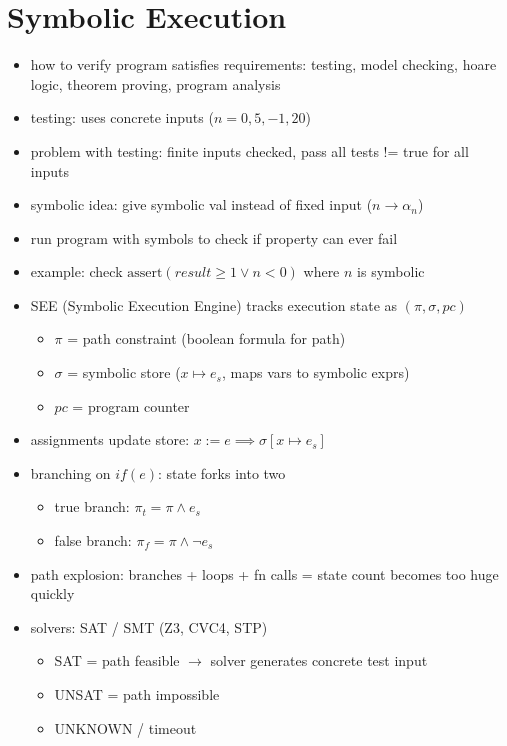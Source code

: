
\setcounter{chapter}{2}
\chapter{Symbolic Execution}

\begin{itemize}
\item how to verify program satisfies requirements: testing, model checking, hoare logic, theorem proving, program analysis

\item testing: uses concrete inputs ($n=0, 5, -1, 20$)
\item problem with testing: finite inputs checked, pass all tests != true for all inputs

\item symbolic idea: give symbolic val instead of fixed input ($n \rightarrow \alpha_n$)
\item run program with symbols to check if property can ever fail
\item example: check $\text{assert}(result \geq 1 \lor n < 0)$ where $n$ is symbolic

\item SEE (Symbolic Execution Engine) tracks execution state as $(\pi, \sigma, pc)$
\begin{itemize}
    \item $\pi$ = path constraint (boolean formula for path)
    \item $\sigma$ = symbolic store ($x \mapsto e_s$, maps vars to symbolic exprs)
    \item $pc$ = program counter
\end{itemize}

\item assignments update store: $x := e \implies \sigma[x \mapsto e_s]$

\item branching on $if(e)$: state forks into two
\begin{itemize}
    \item true branch: $\pi_t = \pi \land e_s$
    \item false branch: $\pi_f = \pi \land \neg e_s$
\end{itemize}

\item path explosion: branches + loops + fn calls = state count becomes too huge quickly

\item solvers: SAT / SMT (Z3, CVC4, STP)
\begin{itemize}
    \item SAT = path feasible $\rightarrow$ solver generates concrete test input
    \item UNSAT = path impossible
    \item UNKNOWN / timeout
\end{itemize}


\end{itemize}

